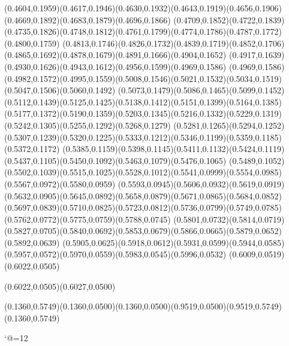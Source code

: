 (0.4604,0.1959)(0.4617,0.1946)(0.4630,0.1932)(0.4643,0.1919)(0.4656,0.1906)(0.4669,0.1892)(0.4683,0.1879)(0.4696,0.1866)
(0.4709,0.1852)(0.4722,0.1839)(0.4735,0.1826)(0.4748,0.1812)(0.4761,0.1799)(0.4774,0.1786)(0.4787,0.1772)(0.4800,0.1759)
(0.4813,0.1746)(0.4826,0.1732)(0.4839,0.1719)(0.4852,0.1706)(0.4865,0.1692)(0.4878,0.1679)(0.4891,0.1666)(0.4904,0.1652)
(0.4917,0.1639)(0.4930,0.1626)(0.4943,0.1612)(0.4956,0.1599)(0.4969,0.1586)
\PST@Solid(0.4969,0.1586)(0.4982,0.1572)(0.4995,0.1559)(0.5008,0.1546)(0.5021,0.1532)(0.5034,0.1519)(0.5047,0.1506)(0.5060,0.1492)
(0.5073,0.1479)(0.5086,0.1465)(0.5099,0.1452)(0.5112,0.1439)(0.5125,0.1425)(0.5138,0.1412)(0.5151,0.1399)(0.5164,0.1385)
(0.5177,0.1372)(0.5190,0.1359)(0.5203,0.1345)(0.5216,0.1332)(0.5229,0.1319)(0.5242,0.1305)(0.5255,0.1292)(0.5268,0.1279)
(0.5281,0.1265)(0.5294,0.1252)(0.5307,0.1239)(0.5320,0.1225)(0.5333,0.1212)(0.5346,0.1199)(0.5359,0.1185)(0.5372,0.1172)
(0.5385,0.1159)(0.5398,0.1145)(0.5411,0.1132)(0.5424,0.1119)(0.5437,0.1105)(0.5450,0.1092)(0.5463,0.1079)(0.5476,0.1065)
(0.5489,0.1052)(0.5502,0.1039)(0.5515,0.1025)(0.5528,0.1012)(0.5541,0.0999)(0.5554,0.0985)(0.5567,0.0972)(0.5580,0.0959)
(0.5593,0.0945)(0.5606,0.0932)(0.5619,0.0919)(0.5632,0.0905)(0.5645,0.0892)(0.5658,0.0879)(0.5671,0.0865)(0.5684,0.0852)
(0.5697,0.0839)(0.5710,0.0825)(0.5723,0.0812)(0.5736,0.0799)(0.5749,0.0785)(0.5762,0.0772)(0.5775,0.0759)(0.5788,0.0745)
(0.5801,0.0732)(0.5814,0.0719)(0.5827,0.0705)(0.5840,0.0692)(0.5853,0.0679)(0.5866,0.0665)(0.5879,0.0652)(0.5892,0.0639)
(0.5905,0.0625)(0.5918,0.0612)(0.5931,0.0599)(0.5944,0.0585)(0.5957,0.0572)(0.5970,0.0559)(0.5983,0.0545)(0.5996,0.0532)
(0.6009,0.0519)(0.6022,0.0505)

\PST@Solid(0.6022,0.0505)(0.6027,0.0500)



\PST@Solid(0.1360,0.5749)(0.1360,0.0500)\PST@Solid(0.1360,0.0500)(0.9519,0.0500)(0.9519,0.5749)(0.1360,0.5749)

\catcode`@=12
\fi
\endpspicture
